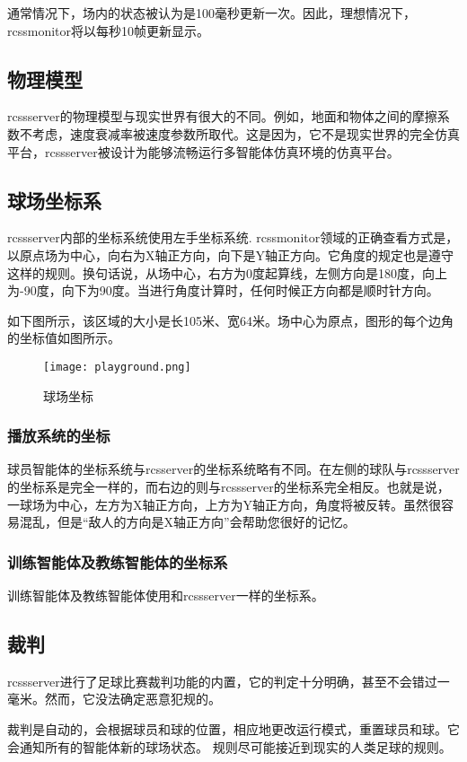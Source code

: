 通常情况下，场内的状态被认为是100毫秒更新一次。因此，理想情况下，rcssmonitor将以每秒10帧更新显示。

\subsection{物理模型}
rcssserver的物理模型与现实世界有很大的不同。例如，地面和物体之间的摩擦系数不考虑，速度衰减率被速度参数所取代。这是因为，它不是现实世界的完全仿真平台，rcssserver被设计为能够流畅运行多智能体仿真环境的仿真平台。



\subsection{球场坐标系}
rcssserver内部的坐标系统使用左手坐标系统. rcssmonitor领域的正确查看方式是，以原点场为中心，向右为X轴正方向，向下是Y轴正方向。它角度的规定也是遵守这样的规则。换句话说，从场中心，右方为0度起算线，左侧方向是180度，向上为-90度，向下为90度。当进行角度计算时，任何时候正方向都是顺时针方向。

如下图所示，该区域的大小是长105米、宽64米。场中心为原点，图形的每个边角的坐标值如图所示。
\begin{figure}[htb]
	\centering \texttt{[image: playground.png]}
	\caption{球场坐标}
\end{figure}
\subsubsection{播放系统的坐标}

球员智能体的坐标系统与rcsserver的坐标系统略有不同。在左侧的球队与rcssserver的坐标系是完全一样的，而右边的则与rcssserver的坐标系完全相反。也就是说，一球场为中心，左方为X轴正方向，上方为Y轴正方向，角度将被反转。虽然很容易混乱，但是“敌人的方向是X轴正方向”会帮助您很好的记忆。

\subsubsection{训练智能体及教练智能体的坐标系}
训练智能体及教练智能体使用和rcssserver一样的坐标系。
\subsection{裁判}
rcssserver进行了足球比赛裁判功能的内置，它的判定十分明确，甚至不会错过一毫米。然而，它没法确定恶意犯规的。

裁判是自动的，会根据球员和球的位置，相应地更改运行模式，重置球员和球。它会通知所有的智能体新的球场状态。
规则尽可能接近到现实的人类足球的规则。

